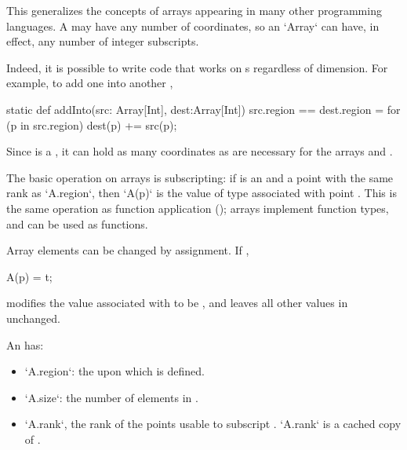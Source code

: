 This generalizes the concepts of arrays appearing in many other programming
languages.  A  may have any number of coordinates, so an
\xcd`Array` can have, in effect, any number of integer subscripts.  

\begin{ex}Indeed, it is possible to write code that works on s regardless 
of dimension.  For example, to add one   into another
, 
\begin{xten}
static def addInto(src: Array[Int], dest:Array[Int])
  {src.region == dest.region}
  = {
    for (p in src.region) 
       dest(p) += src(p);
  }
\end{xten}
\noindent
Since  is a , it can hold as many coordinates as are
necessary for the arrays  and .
\end{ex}

The basic operation on arrays is subscripting: if  is an 
and  a point with the same rank as \xcd`A.region`, then
\xcd`A(p)`
is the value of type  associated with point .
This is the same operation as function application
(); arrays implement function types, and can be
used as functions.

Array elements can be changed by assignment. If , 
\begin{xten}
A(p) = t;
\end{xten}
modifies the value associated with  to be , and leaves all other
values in  unchanged.

An   has: 
\begin{itemize}
\item \xcd`A.region`: the  upon which  is defined.
\item \xcd`A.size`: the number of elements in .
\item \xcd`A.rank`, the rank of the points usable to subscript . 
      \xcd`A.rank` is a cached copy of 
      .
\end{itemize}

